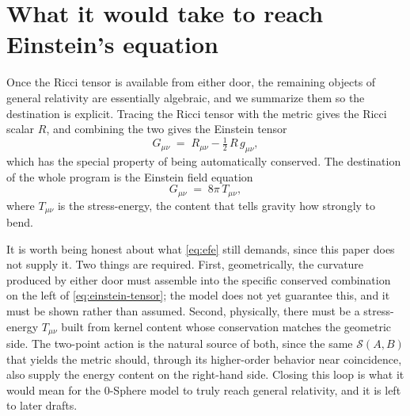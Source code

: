 \documentclass[%
 reprint, amsmath,amssymb, aps, prb, ]{revtex4-2}
\numberwithin{equation}{section}
\begin{document}
\section{What it would take to reach Einstein's equation}
\label{sec:einstein}

Once the Ricci tensor is available from either door, the remaining objects of general relativity are essentially algebraic, and we summarize them so the destination is explicit. Tracing the Ricci tensor with the metric gives the Ricci scalar $R$, and combining the two gives the Einstein tensor
\begin{equation}
G_{\mu\nu} \;=\; R_{\mu\nu} - \tfrac12\,R\,g_{\mu\nu},
\label{eq:einstein-tensor}
\end{equation}
which has the special property of being automatically conserved. The destination of the whole program is the Einstein field equation
\begin{equation}
G_{\mu\nu} \;=\; 8\pi\,T_{\mu\nu},
\label{eq:efe}
\end{equation}
where $T_{\mu\nu}$ is the stress-energy, the content that tells gravity how strongly to bend.

It is worth being honest about what \eqref{eq:efe} still demands, since this paper does not supply it. Two things are required. First, geometrically, the curvature produced by either door must assemble into the specific conserved combination on the left of \eqref{eq:einstein-tensor}; the model does not yet guarantee this, and it must be shown rather than assumed. Second, physically, there must be a stress-energy $T_{\mu\nu}$ built from kernel content whose conservation matches the geometric side. The two-point action is the natural source of both, since the same $\mathcal{S}(A,B)$ that yields the metric should, through its higher-order behavior near coincidence, also supply the energy content on the right-hand side. Closing this loop is what it would mean for the 0-Sphere model to truly reach general relativity, and it is left to later drafts.
\end{document}
